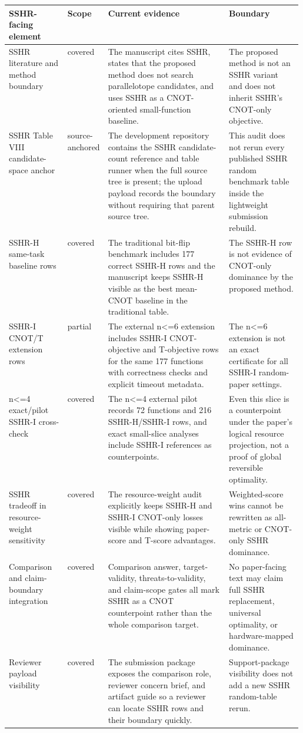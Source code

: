\begin{tabularx}{\linewidth}{>{\raggedright\arraybackslash}p{0.20\linewidth}>{\raggedright\arraybackslash}p{0.13\linewidth}>{\raggedright\arraybackslash}X>{\raggedright\arraybackslash}p{0.25\linewidth}}
\toprule
SSHR-facing element & Scope & Current evidence & Boundary \\
\midrule
SSHR literature and method boundary & covered & The manuscript cites SSHR, states that the proposed method does not search parallelotope candidates, and uses SSHR as a CNOT-oriented small-function baseline. & The proposed method is not an SSHR variant and does not inherit SSHR's CNOT-only objective. \\
SSHR Table VIII candidate-space anchor & source-anchored & The development repository contains the SSHR candidate-count reference and table runner when the full source tree is present; the upload payload records the boundary without requiring that parent source tree. & This audit does not rerun every published SSHR random benchmark table inside the lightweight submission rebuild. \\
SSHR-H same-task baseline rows & covered & The traditional bit-flip benchmark includes 177 correct SSHR-H rows and the manuscript keeps SSHR-H visible as the best mean-CNOT baseline in the traditional table. & The SSHR-H row is not evidence of CNOT-only dominance by the proposed method. \\
SSHR-I CNOT/T extension rows & partial & The external n<=6 extension includes SSHR-I CNOT-objective and T-objective rows for the same 177 functions with correctness checks and explicit timeout metadata. & The n<=6 extension is not an exact certificate for all SSHR-I random-paper settings. \\
n<=4 exact/pilot SSHR-I cross-check & covered & The n<=4 external pilot records 72 functions and 216 SSHR-H/SSHR-I rows, and exact small-slice analyses include SSHR-I references as counterpoints. & Even this slice is a counterpoint under the paper's logical resource projection, not a proof of global reversible optimality. \\
SSHR tradeoff in resource-weight sensitivity & covered & The resource-weight audit explicitly keeps SSHR-H and SSHR-I CNOT-only losses visible while showing paper-score and T-score advantages. & Weighted-score wins cannot be rewritten as all-metric or CNOT-only SSHR dominance. \\
Comparison and claim-boundary integration & covered & Comparison answer, target-validity, threats-to-validity, and claim-scope gates all mark SSHR as a CNOT counterpoint rather than the whole comparison target. & No paper-facing text may claim full SSHR replacement, universal optimality, or hardware-mapped dominance. \\
Reviewer payload visibility & covered & The submission package exposes the comparison role, reviewer concern brief, and artifact guide so a reviewer can locate SSHR rows and their boundary quickly. & Support-package visibility does not add a new SSHR random-table rerun. \\
\bottomrule
\end{tabularx}
